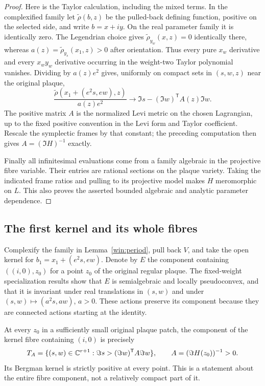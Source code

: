 \begin{proof}
Here is the Taylor calculation, including the mixed terms.  In the
complexified family let $\widetilde\rho(b,z)$ be the pulled-back defining
function, positive on the selected side, and write $b=x+iy$.  On the
real parameter family it is identically zero.  The Legendrian choice
gives $\widetilde\rho_{y_w}(x,z)=0$ identically there, whereas
$a(z)=\widetilde\rho_{y_s}(x_1,z)>0$ after orientation.  Thus every pure
$x_w$ derivative and every $x_wy_w$ derivative occurring in the
weight-two Taylor polynomial vanishes.  Dividing by $a(z)e^2$ gives,
uniformly on compact sets in $(s,w,z)$ near the original plaque,
\[
 \frac{\widetilde\rho(x_1+(e^2s,ew),z)}{a(z)e^2}
       \longrightarrow\Im s-(\Im w)^{\mathsf T}A(z)\Im w.
\]
The positive matrix $A$ is the normalized Levi metric on the chosen
Lagrangian, up to the fixed positive convention in the Levi form and
Taylor coefficient.  Rescale the symplectic frames by that constant;
the preceding computation then gives $A=(\Im H)^{-1}$ exactly.

Finally all infinitesimal evaluations come from a family algebraic in
the projective fibre variable.  Their entries are rational sections on
the plaque variety.  Taking the indicated frame ratios and pulling to
its projective model makes $H$ meromorphic on $L$.  This also proves
the asserted bounded algebraic and analytic parameter dependence.
\end{proof}

\subsection{The first kernel and its whole fibres}

Complexify the family in Lemma~\ref{win:period}, pull back $V$, and take
the open kernel for $b_1=x_1+(e^2s,ew)$.  Denote by $E$ the component
containing $((i,0),z_0)$ for a point $z_0$ of the original regular plaque.
The fixed-weight specialization results show that $E$ is semialgebraic
and locally pseudoconvex, and that it is invariant under real
translations in $(s,w)$ and under $(s,w)\mapsto(a^2s,aw)$, $a>0$.
These actions preserve its component because they are connected actions
starting at the identity.

\begin{lemma}\label{win:seed-bergman}
At every $z_0$ in a sufficiently small original plaque patch, the
component of the kernel fibre containing $(i,0)$ is precisely
\[
 T_A=\{(s,w)\in\mathbb C^{r+1}:\Im s>(\Im w)^{\mathsf T}A\Im w\},
                    \qquad A=(\Im H(z_0))^{-1}>0.
\]
Its Bergman kernel is strictly positive at every point.  This is a
statement about the entire fibre component, not a relatively compact
part of it.
\end{lemma}

